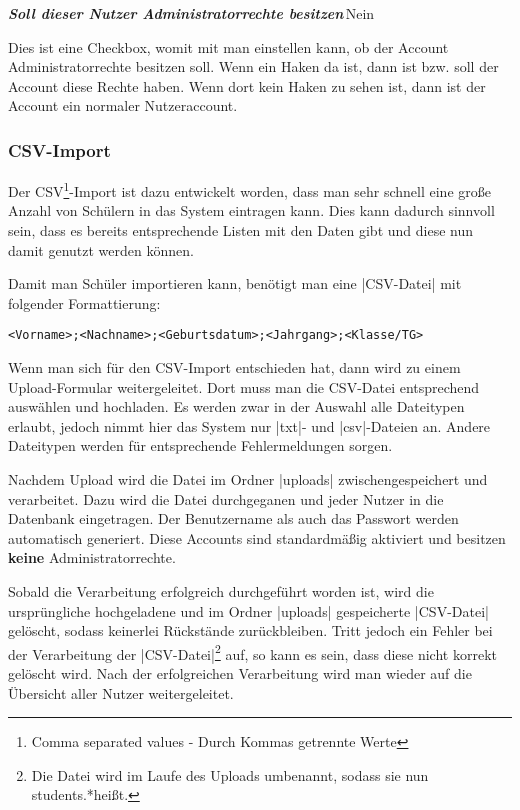 \documentclass[ngerman]{ltxdoc}
\newcommand{\DescribeOption}[4]{
  \DescribeMacro{#1}
  \begin{minipage}[t]{\textwidth}
    \textit{\textbf{\textcolor{mLightGreen}{#2}}}\dotfill\,#3\par
    \begingroup
    \vspace{0.5em}#4\par
    \endgroup
  \end{minipage}
}
\begin{document}
\DescribeOption{Administrator}{Soll dieser Nutzer Administratorrechte besitzen}{Nein}{
  Dies ist eine Checkbox, womit mit man einstellen kann, ob der Account
  Administratorrechte besitzen soll. Wenn ein Haken da ist, dann ist bzw.
  soll der Account diese Rechte haben. Wenn dort kein Haken zu sehen ist, dann ist der
  Account ein normaler Nutzeraccount.
}

\subsubsection{CSV-Import}

Der CSV\footnote{Comma separated values - Durch Kommas getrennte Werte}-Import ist dazu entwickelt worden, dass man sehr schnell eine große
Anzahl von Schülern in das System eintragen kann. Dies kann dadurch sinnvoll sein,
dass es bereits entsprechende Listen mit den Daten gibt und diese nun damit
genutzt werden können.

Damit man Schüler importieren kann, benötigt man eine |CSV-Datei| mit folgender
Formattierung:

\begin{lstlisting}[style=tex]
<Vorname>;<Nachname>;<Geburtsdatum>;<Jahrgang>;<Klasse/TG>
\end{lstlisting}

Wenn man sich für den CSV-Import entschieden hat, dann wird zu einem Upload-Formular
weitergeleitet. Dort muss man die CSV-Datei entsprechend auswählen und hochladen.
Es werden zwar in der Auswahl alle Dateitypen erlaubt, jedoch nimmt hier das
System nur |txt|- und |csv|-Dateien an. Andere Dateitypen werden für entsprechende
Fehlermeldungen sorgen.

Nachdem Upload wird die Datei im Ordner |uploads| zwischengespeichert und verarbeitet.
Dazu wird die Datei durchgeganen und jeder Nutzer in die Datenbank eingetragen.
Der Benutzername als auch das Passwort werden automatisch generiert. Diese
Accounts sind standardmäßig aktiviert und besitzen \textbf{keine} Administratorrechte.

Sobald die Verarbeitung erfolgreich durchgeführt worden ist, wird die ursprüngliche
hochgeladene und im Ordner |uploads| gespeicherte |CSV-Datei| gelöscht, sodass
keinerlei Rückstände zurückbleiben. Tritt jedoch ein Fehler bei der Verarbeitung
der |CSV-Datei|\footnote{Die Datei wird im Laufe des Uploads umbenannt, sodass sie nun \glqq students.*\grqq heißt.}
auf, so kann es sein, dass diese nicht korrekt gelöscht wird. Nach der erfolgreichen
Verarbeitung wird man wieder auf die Übersicht aller Nutzer weitergeleitet.
\end{document}
